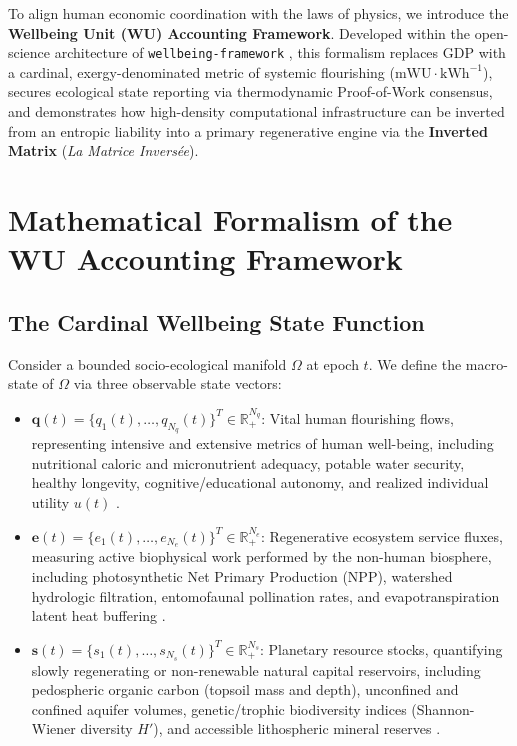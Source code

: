 \documentclass[aps,pre,twocolumn,10pt,superscriptaddress,amsmath,amssymb,amsfonts,floatfix,showkeys]{revtex4-2}
\begin{document}
To align human economic coordination with the laws of physics, we introduce the \textbf{Wellbeing Unit (WU) Accounting Framework}. Developed within the open-science architecture of \texttt{wellbeing-framework} \cite{RanaoraSunStandard}, this formalism replaces GDP with a cardinal, exergy-denominated metric of systemic flourishing ($\text{mWU}\cdot\text{kWh}^{-1}$), secures ecological state reporting via thermodynamic Proof-of-Work consensus, and demonstrates how high-density computational infrastructure can be inverted from an entropic liability into a primary regenerative engine via the \textbf{Inverted Matrix} (\textit{La Matrice Invers\'ee}).

\section{Mathematical Formalism of the WU Accounting Framework}

\subsection{The Cardinal Wellbeing State Function}

Consider a bounded socio-ecological manifold $\Omega$ at epoch $t$. We define the macro-state of $\Omega$ via three observable state vectors:
\begin{itemize}
    \item $\bm{q}(t) = \{q_1(t), \dots, q_{N_q}(t)\}^T \in \mathbb{R}^{N_q}_{+}$: Vital human flourishing flows, representing intensive and extensive metrics of human well-being, including nutritional caloric and micronutrient adequacy, potable water security, healthy longevity, cognitive/educational autonomy, and realized individual utility $u(t)$ \cite{Robeyns2024, Freire1970}.
    \item $\bm{e}(t) = \{e_1(t), \dots, e_{N_e}(t)\}^T \in \mathbb{R}^{N_e}_{+}$: Regenerative ecosystem service fluxes, measuring active biophysical work performed by the non-human biosphere, including photosynthetic Net Primary Production ($\text{NPP}$), watershed hydrologic filtration, entomofaunal pollination rates, and evapotranspiration latent heat buffering \cite{Costanza1997, Odum1996}.
    \item $\bm{s}(t) = \{s_1(t), \dots, s_{N_s}(t)\}^T \in \mathbb{R}^{N_s}_{+}$: Planetary resource stocks, quantifying slowly regenerating or non-renewable natural capital reservoirs, including pedospheric organic carbon (topsoil mass and depth), unconfined and confined aquifer volumes, genetic/trophic biodiversity indices (Shannon-Wiener diversity $H'$), and accessible lithospheric mineral reserves \cite{Rockstrom2009, Steffen2015}.
\end{itemize}
\end{document}
